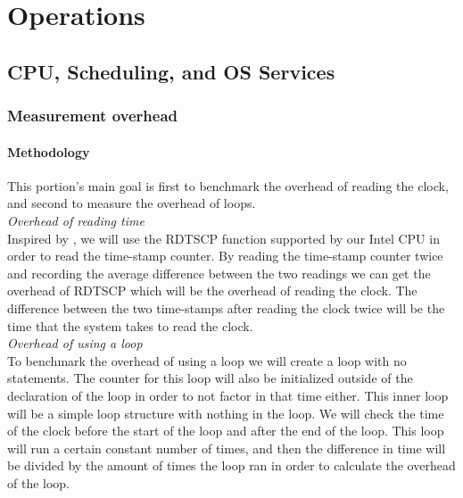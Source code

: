 \section{Operations}
\subsection{CPU, Scheduling, and OS Services}

\subsubsection{Measurement overhead}


\paragraph{Methodology}

This portion's main goal is first to benchmark the overhead of reading the clock, and second to measure the overhead of loops. \\
\textit{Overhead of reading time}\\
Inspired by \cite{paoloni2010benchmark}, we will use the RDTSCP function supported by our Intel CPU in order to read the time-stamp counter. By reading the time-stamp counter twice and recording the average difference between the two readings we can get the overhead of RDTSCP which will be the overhead of reading the clock. The difference between the two time-stamps after reading the clock twice will be the time that the system takes to read the clock. \\
 \textit{Overhead of using a loop}\\
To benchmark the overhead of using a loop we will create a loop with no statements. The counter for this loop will also be initialized outside of the declaration of the loop in order to not factor in that time either. This inner loop will be a simple loop structure with nothing in the loop. We will check the time of the clock before the start of the loop and after the end of the loop. This loop will run a certain constant number of times, and then the difference in time will be divided by the amount of times the loop ran in order to calculate the overhead of the loop.

